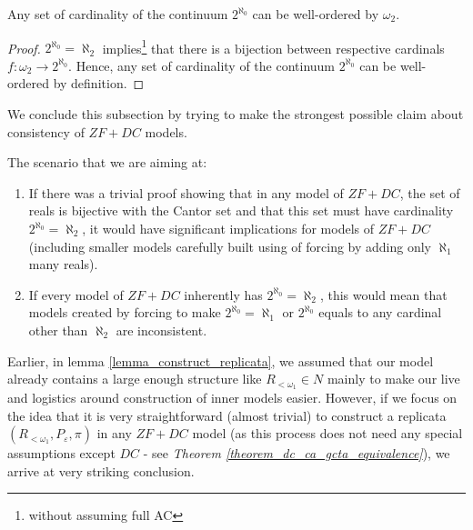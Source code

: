 \begin{corollary}
    Any set of cardinality of the continuum $2^{\aleph_0}$ can be well-ordered by $\omega_2$.
\end{corollary}
\begin{proof}
    $2^{\aleph_0} = \aleph_2$ implies\footnote{without assuming full AC} that there is a bijection between respective cardinals $f: \omega_2 \to 2^{\aleph_0}$. Hence, any set of cardinality of the continuum $2^{\aleph_0}$ can be well-ordered by definition.
\end{proof}

We conclude this subsection by trying to make the strongest possible claim about consistency of $ZF+DC$ models. 

The scenario that we are aiming at:
\begin{enumerate}[label=(\roman*)]
    \item If there was a trivial proof showing that in any model of $ZF + DC$, the set of reals is bijective with the Cantor set and that this set must have cardinality $2^{\aleph_0} = \aleph_2$, it would have significant implications for models of $ZF + DC$ (including smaller models carefully built using of forcing by adding only $\aleph_1$ many reals).
    \item If every model of $ZF + DC$ inherently has $2^{\aleph_0} = \aleph_2$, this would mean that models created by forcing to make $2^{\aleph_0} = \aleph_1$ or $2^{\aleph_0}$ equals to any cardinal other than $\aleph_2$ are inconsistent.
\end{enumerate}

Earlier, in {lemma \ref{lemma_construct_replicata}}, we assumed that our model already contains a large enough structure like $R_{<\omega_1} \in N$ mainly to make our live and logistics around construction of inner models easier. However, if we focus on the idea that it is very straightforward (almost trivial) to construct a replicata $(R_{<\omega_1}, P_\varepsilon, \pi)$ in any $ZF+DC$ model (as this process does not need any special assumptions except $DC$ - see \textit{Theorem \ref{theorem_dc_ca_gcta_equivalence}}), we arrive at very striking conclusion. 

